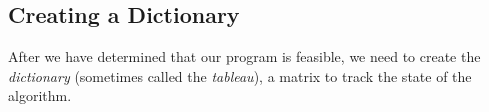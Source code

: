 







\subsection*{Creating a Dictionary} %

After we have determined that our program is feasible, we need to create the \emph{dictionary} (sometimes called the \emph{tableau}), a matrix to track the state of the algorithm.

